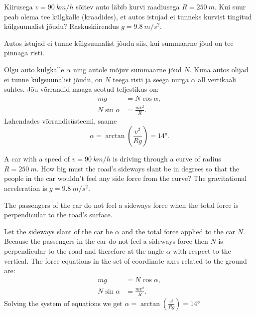 
Kiirusega $v=\SI{90}{km/h}$ sõitev auto läbib kurvi raadiusega $R=\SI{250}{m}$. Kui suur peab olema tee külgkalle (kraadides), et autos istujad ei tunneks kurvist tingitud külgsuunalist jõudu? Raskuskiirendus $g=\SI{9.8}{m/s^{2}}$.

\hint
Autos istujad ei tunne külgsuunalist jõudu siis, kui summaarne jõud on tee pinnaga risti.

\solu
Olgu auto külgkalle $\alpha$ ning autole mõjuv summaarne jõud $N$. Kuna autos olijad ei tunne külgsuunalist jõudu, on $N$ teega risti ja seega nurga $\alpha$ all vertikaali suhtes. Jõu võrrandid maaga seotud teljestikus on:
\begin{align*}
mg &= N\cos \alpha,\\
N\sin\alpha &= \frac{mv^2}{R}.
\end{align*}
Lahendades võrrandisüsteemi, saame
\[
\alpha = \arctan\left(\frac{v^2}{Rg}\right) = \ang{14}.
\]

A car with a speed of $v=\SI{90}{km/h}$ is driving through a curve of radius $R=\SI{250}{m}$. How big must the road’s sideways slant be in degrees so that the people in the car wouldn’t feel any side force from the curve? The gravitational acceleration is $g=\SI{9.8}{m/s^{2}}$.

\hinteng
The passengers of the car do not feel a sideways force when the total force is perpendicular to the road’s surface.

\solueng
Let the sideways slant of the car be $\alpha$ and the total force applied to the car $N$. Because the passengers in the car do not feel a sideways force then $N$ is perpendicular to the road and therefore at the angle $\alpha$ with respect to the vertical. The force equations in the set of coordinate axes related to the ground are: 
\begin{align*}
mg &= N\cos \alpha,\\
N\sin\alpha &= \frac{mv^2}{R}.
\end{align*}
Solving the system of equations we get $\alpha = \arctan(\frac{v^2}{Rg}) = \ang{14}$
\probend